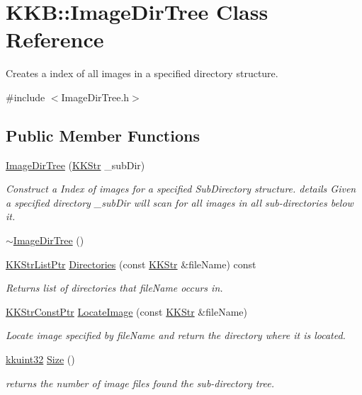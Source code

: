 \hypertarget{class_k_k_b_1_1_image_dir_tree}{}\section{K\+KB\+:\+:Image\+Dir\+Tree Class Reference}
\label{class_k_k_b_1_1_image_dir_tree}


Creates a index of all images in a specified directory structure.  




{\ttfamily \#include $<$Image\+Dir\+Tree.\+h$>$}

\subsection*{Public Member Functions}
\begin{DoxyCompactItemize}
\item 
\hyperlink{class_k_k_b_1_1_image_dir_tree_a9844dae569bce618aba914572372d416}{Image\+Dir\+Tree} (\hyperlink{class_k_k_b_1_1_k_k_str}{K\+K\+Str} \+\_\+sub\+Dir)
\begin{DoxyCompactList}\small\item\em Construct a Index of images for a specified Sub\+Directory structure. details Given a specified directory \textquotesingle{}\+\_\+sub\+Dir\textquotesingle{} will scan for all images in all sub-\/directories below it. \end{DoxyCompactList}\item 
\hyperlink{class_k_k_b_1_1_image_dir_tree_a2f17160eac0aec495998511bbc3e5809}{$\sim$\+Image\+Dir\+Tree} ()
\item 
\hyperlink{namespace_k_k_b_a8f5f50672f37857425120831223888aa}{K\+K\+Str\+List\+Ptr} \hyperlink{class_k_k_b_1_1_image_dir_tree_ab3764185c5b04c406fe81de9051bff52}{Directories} (const \hyperlink{class_k_k_b_1_1_k_k_str}{K\+K\+Str} \&file\+Name) const 
\begin{DoxyCompactList}\small\item\em Returns list of directories that \textquotesingle{}file\+Name\textquotesingle{} occurs in. \end{DoxyCompactList}\item 
\hyperlink{namespace_k_k_b_a46f665ec17615c856eff3d21f78bed5c}{K\+K\+Str\+Const\+Ptr} \hyperlink{class_k_k_b_1_1_image_dir_tree_a3c06897dd241b670146ffbb65d69cd46}{Locate\+Image} (const \hyperlink{class_k_k_b_1_1_k_k_str}{K\+K\+Str} \&file\+Name)
\begin{DoxyCompactList}\small\item\em Locate image specified by \textquotesingle{}file\+Name\textquotesingle{} and return the directory where it is located. \end{DoxyCompactList}\item 
\hyperlink{namespace_k_k_b_af8d832f05c54994a1cce25bd5743e19a}{kkuint32} \hyperlink{class_k_k_b_1_1_image_dir_tree_a87e55bcd61dce71f6be86bc3816c1723}{Size} ()
\begin{DoxyCompactList}\small\item\em returns the number of image files found the sub-\/directory tree. \end{DoxyCompactList}\end{DoxyCompactItemize}


